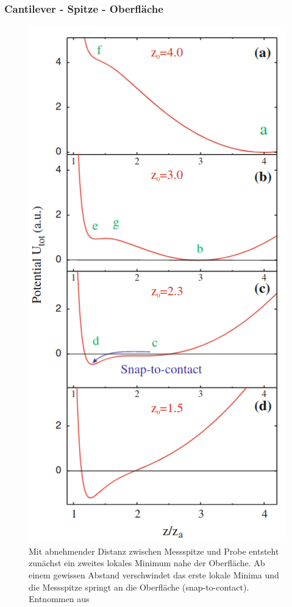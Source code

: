         \subsubsection{Cantilever - Spitze - Oberfläche}
          \FloatBarrier
          \begin{figure}
            \includegraphics[scale = 0.45]{pictures/pot_contact.png}
            \caption{Mit abnehmender Distanz zwischen Messspitze und Probe entsteht zunächst ein zweites lokales Minimum nahe der Oberfläche. Ab einem gewissen Abstand verschwindet das erste lokale Minima und die Messspitze springt an die Oberfläche (snap-to-contact). Entnommen aus \cite{voigtlander_scanning_2015}}
            \label{fig:pot_contact}
          \end{figure}
